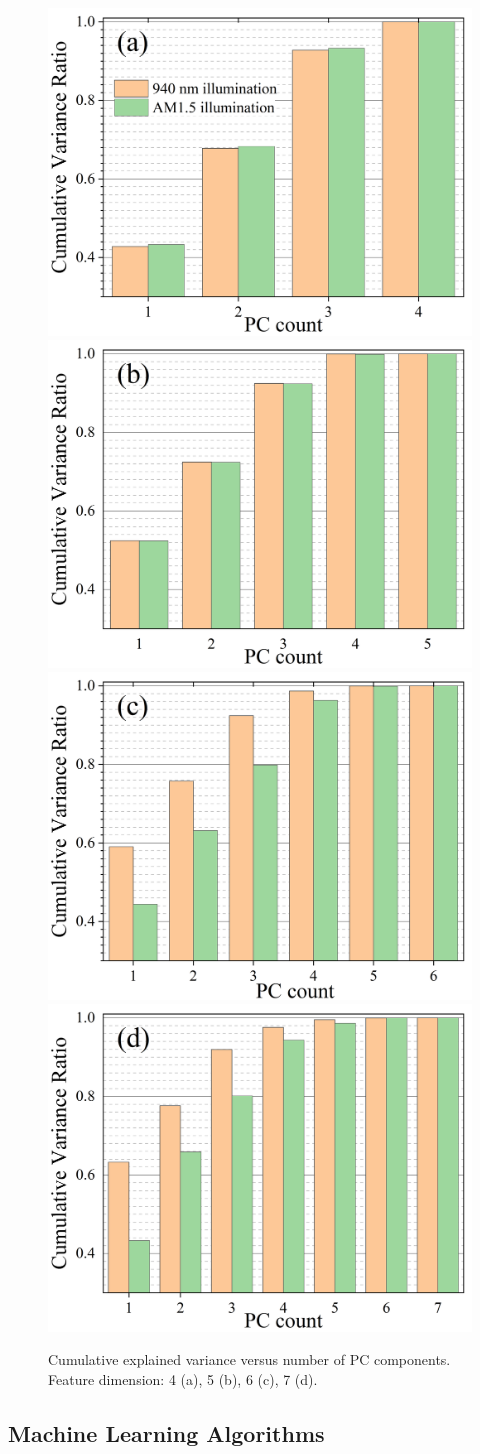 \documentclass[a4paper,fleqn,draft]{cas-sc}
\begin{document}
\begin{figure}
	\centering
     \includegraphics[width=0.24\linewidth]{Fig2a.png}
     \includegraphics[width=0.24\linewidth]{Fig2b.png}
     \includegraphics[width=0.24\linewidth]{Fig2c.png}
     \includegraphics[width=0.24\linewidth]{Fig2d.png}
	  \caption{Cumulative explained variance versus number of PC components.
Feature dimension: 4 (a), 5 (b), 6 (c), 7 (d).
}\label{fig2}
\end{figure}


\subsection{Machine Learning Algorithms}
\end{document}
